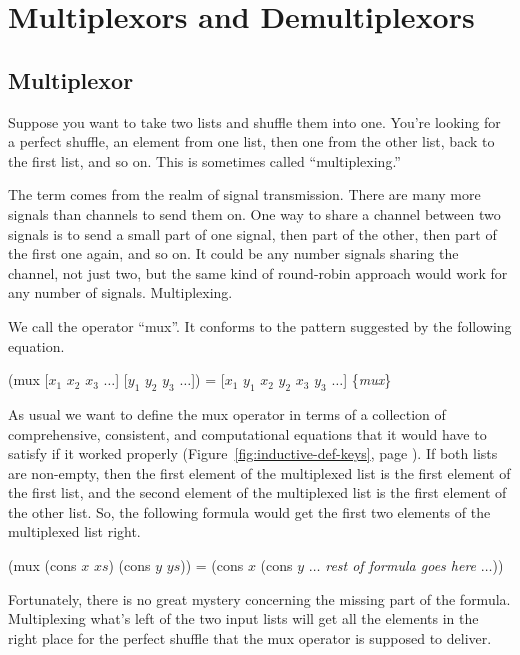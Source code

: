 \chapter{Multiplexors and Demultiplexors}
\label{ch:mux-dmx}

\section{Multiplexor}
\label{sec:mux}

Suppose you want to take two lists and shuffle them into one.
You're looking for a perfect shuffle, an element from one list,
then one from the other list, back to the first list, and so on.
This is sometimes called ``multiplexing.''

The term comes from the realm of signal transmission.
There are many more signals than channels to send them on.
One way to share a channel between two signals is to
send a small part of one signal, then part of the other,
then part of the first one again, and so on.
It could be any number signals sharing the channel, not just two,
but the same kind of round-robin approach would work for any
number of signals.
Multiplexing.

We call the operator ``mux''.
It conforms to the pattern suggested by the following equation.

\hspace{1cm} (mux [$x_1$ $x_2$ $x_3$ $\dots$] [$y_1$ $y_2$ $y_3$ $\dots$]) =
     [$x_1$ $y_1$ $x_2$ $y_2$ $x_3$ $y_3$ $\dots$] \hfill \{\emph{mux}\}

As usual we want to define the mux operator in terms of
a collection of comprehensive, consistent, and computational equations
that it would have to satisfy if it worked properly
(Figure~\ref{fig:inductive-def-keys}, page \pageref{fig:inductive-def-keys}).
If both lists are non-empty,
then the first element of the multiplexed list is the first element of the first list,
and the second element of the multiplexed list is the first element of the other list.
So, the following formula would
get the first two elements of the multiplexed list right.

\hspace{1cm} (mux (cons $x$ $xs$) (cons $y$ $ys$)) =
(cons $x$ (cons $y$ $\dots$ \emph{rest of formula goes here} $\dots$))

Fortunately, there is no great mystery concerning the missing part of the formula.
Multiplexing what's left of the two input lists will get all the elements
in the right place for the perfect shuffle that the mux operator is supposed to deliver.

